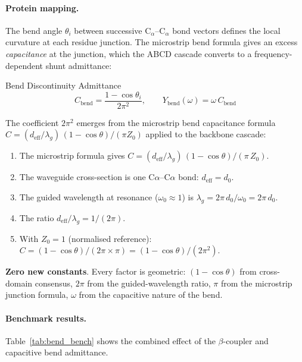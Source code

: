 \paragraph{Protein mapping.}
The bend angle $\theta_i$ between successive $\text{C}_\alpha$--$\text{C}_\alpha$
bond vectors defines the local curvature at each residue junction.
The microstrip bend formula gives an excess \emph{capacitance} at the
junction, which the ABCD cascade converts to a frequency-dependent
shunt admittance:
\begin{resultbox}{Bend Discontinuity Admittance}
\begin{equation}
    C_\text{bend} = \frac{1 - \cos\theta_i}{2\pi^2},
    \qquad
    Y_\text{bend}(\omega) = \omega\,C_\text{bend}
    \label{eq:y_bend}
\end{equation}
\end{resultbox}
The coefficient $2\pi^2$ emerges from the microstrip bend
capacitance formula $C = (d_\text{eff}/\lambda_g)\,(1-\cos\theta)/(\pi Z_0)$
applied to the backbone cascade:
\begin{enumerate}
    \item The microstrip formula gives
          $C = (d_\text{eff}/\lambda_g)\,(1-\cos\theta)/(\pi\,Z_0)$.
    \item The waveguide cross-section is one C$\alpha$--C$\alpha$ bond:
          $d_\text{eff} = d_0$.
    \item The guided wavelength at resonance ($\omega_0 \approx 1$)
          is $\lambda_g = 2\pi\,d_0/\omega_0 = 2\pi\,d_0$.
    \item The ratio $d_\text{eff}/\lambda_g = 1/(2\pi)$.
    \item With $Z_0 = 1$ (normalised reference):
          $C = (1-\cos\theta)/(2\pi \times \pi) = (1-\cos\theta)/(2\pi^2)$.
\end{enumerate}
\textbf{Zero new constants}.  Every factor is geometric:
$(1-\cos\theta)$ from cross-domain consensus, $2\pi$ from the
guided-wavelength ratio, $\pi$ from the microstrip junction formula,
$\omega$ from the capacitive nature of the bend.

\paragraph{Benchmark results.}
Table~\ref{tab:bend_bench} shows the combined effect of the
$\beta$-coupler and capacitive bend admittance.

